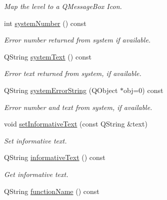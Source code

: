 \begin{DoxyCompactItemize}
\begin{DoxyCompactList}\small\item\em Map the level to a QMessageBox Icon. \end{DoxyCompactList}\item 
\hypertarget{classmdt_error_a1be3f45cd56b3142f50c288df9f53204}{
int \hyperlink{classmdt_error_a1be3f45cd56b3142f50c288df9f53204}{systemNumber} () const }
\label{classmdt_error_a1be3f45cd56b3142f50c288df9f53204}

\begin{DoxyCompactList}\small\item\em Error number returned from system if available. \end{DoxyCompactList}\item 
\hypertarget{classmdt_error_a6cd449e657f321b86d234269b5e92cda}{
QString \hyperlink{classmdt_error_a6cd449e657f321b86d234269b5e92cda}{systemText} () const }
\label{classmdt_error_a6cd449e657f321b86d234269b5e92cda}

\begin{DoxyCompactList}\small\item\em Error text returned from system, if available. \end{DoxyCompactList}\item 
QString \hyperlink{classmdt_error_a28d22c0b9341faacfef22a7deae2da3c}{systemErrorString} (QObject $\ast$obj=0) const 
\begin{DoxyCompactList}\small\item\em Error number and text from system, if available. \end{DoxyCompactList}\item 
\hypertarget{classmdt_error_a8ef108a0502df7875f1b54bbb2a8919d}{
void \hyperlink{classmdt_error_a8ef108a0502df7875f1b54bbb2a8919d}{setInformativeText} (const QString \&text)}
\label{classmdt_error_a8ef108a0502df7875f1b54bbb2a8919d}

\begin{DoxyCompactList}\small\item\em Set informative text. \end{DoxyCompactList}\item 
\hypertarget{classmdt_error_adcc1905f585c327cec8a2e31af616651}{
QString \hyperlink{classmdt_error_adcc1905f585c327cec8a2e31af616651}{informativeText} () const }
\label{classmdt_error_adcc1905f585c327cec8a2e31af616651}

\begin{DoxyCompactList}\small\item\em Get informative text. \end{DoxyCompactList}\item 
\hypertarget{classmdt_error_abff9bc71ff554f6f6189be88b0afa731}{
QString \hyperlink{classmdt_error_abff9bc71ff554f6f6189be88b0afa731}{functionName} () const }
\label{classmdt_error_abff9bc71ff554f6f6189be88b0afa731}


\end{DoxyCompactItemize}
